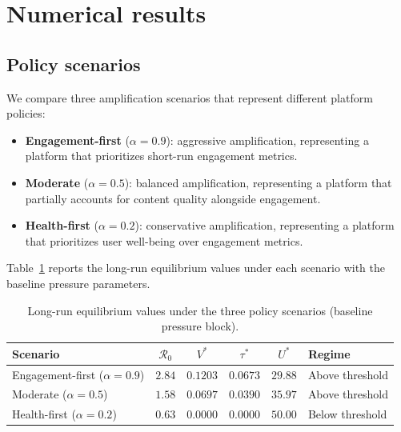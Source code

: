 \documentclass[11pt]{article}
\begin{document}
\newpage
\section{Numerical results}
\label{sec:results}

\subsection{Policy scenarios}

We compare three amplification scenarios that represent different platform policies:
\begin{itemize}[leftmargin=1.5em]
    \item \textbf{Engagement-first} ($\alpha = 0.9$): aggressive amplification, representing a platform that prioritizes short-run engagement metrics.
    \item \textbf{Moderate} ($\alpha = 0.5$): balanced amplification, representing a platform that partially accounts for content quality alongside engagement.
    \item \textbf{Health-first} ($\alpha = 0.2$): conservative amplification, representing a platform that prioritizes user well-being over engagement metrics.
\end{itemize}

Table~\ref{tab:scenarios} reports the long-run equilibrium values under each scenario with the baseline pressure parameters.

\begin{table}[htbp]
\centering
\caption{Long-run equilibrium values under the three policy scenarios (baseline pressure block).}
\label{tab:scenarios}
\begin{tabular}{lccccl}
\toprule
Scenario & $\mathcal{R}_0$ & $V^*$ & $\tau^*$ & $U^*$ & Regime \\
\midrule
Engagement-first ($\alpha = 0.9$) & $2.84$ & $0.1203$ & $0.0673$ & $29.88$ & Above threshold \\
Moderate ($\alpha = 0.5$) & $1.58$ & $0.0697$ & $0.0390$ & $35.97$ & Above threshold \\
Health-first ($\alpha = 0.2$) & $0.63$ & $0.0000$ & $0.0000$ & $50.00$ & Below threshold \\
\bottomrule
\end{tabular}
\end{table}
\end{document}

